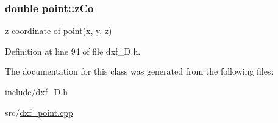\hypertarget{classpoint_a7a939155420b87e651d18dd364e017b1}{
\subsubsection[{z\-Co}]{\setlength{\rightskip}{0pt plus 5cm}double point\-::z\-Co}}\label{classpoint_a7a939155420b87e651d18dd364e017b1}
z-\/coordinate of point(x, y, z) 

Definition at line 94 of file dxf\-\_\-D.\-h.



The documentation for this class was generated from the following files\-:\begin{DoxyCompactItemize}
\item 
include/\hyperlink{dxf__2D_8h}{dxf\-\_\-D.\-h}\item 
src/\hyperlink{dxf__point_8cpp}{dxf\-\_\-point.\-cpp}\end{DoxyCompactItemize}

